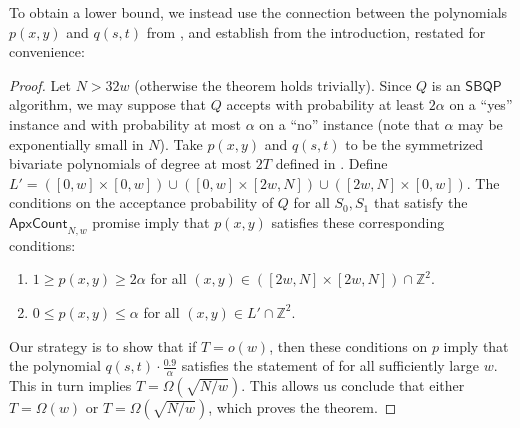 \documentclass[10pt,a4paper]{article}
\newcommand{\<}{\langle}
\renewcommand{\>}{\rangle}
\newcommand{\ApxCount}{\mathsf{ApxCount}_{N,w}}
\begin{document}
To obtain a lower bound, we
instead use the connection between the polynomials $p(x,y)$ and $q(s,t)$
from , and establish  from the
introduction, restated for convenience:

\sbqp*

\begin{proof}
Let $N > 32w$ (otherwise the theorem holds trivially). Since $Q$ is an $\mathsf{SBQP}$ algorithm, we may suppose that $Q$ accepts with probability at least $2\alpha$ on a ``yes'' instance and with probability at most $\alpha$ on a ``no'' instance (note that $\alpha$ may be exponentially small in $N$). Take $p(x,y)$ and $q(s, t)$ to be the symmetrized bivariate polynomials of degree at most $2T$ defined in . Define $L' = ([0, w] \times [0, w]) \cup ([0, w] \times [2w, N]) \cup ([2w, N] \times [0, w])$. The conditions on the acceptance probability of $Q$ for all $S_0, S_1$ that satisfy the $\ApxCount$ promise imply that $p(x, y)$ satisfies these corresponding conditions:
\begin{enumerate}
\item $1 \ge p(x, y) \ge 2\alpha$ for all $(x, y) \in \left([2w, N] \times [2w, N]\right) \cap \mathbb{Z}^2$.
\item $0 \le p(x, y) \le \alpha$ for all $(x, y) \in L' \cap \mathbb{Z}^2$.
\end{enumerate}

Our strategy is to show that if $T = o(w)$, then these conditions on $p$ imply that the polynomial $q(s, t) \cdot \frac{0.9}{\alpha}$ satisfies the statement of  for all sufficiently large $w$. This in turn implies $T = \Omega(\sqrt{N/w})$. This allows us conclude that either $T = \Omega(w)$ or $T = \Omega(\sqrt{N/w})$, which proves the theorem.


\end{proof}
\end{document}
